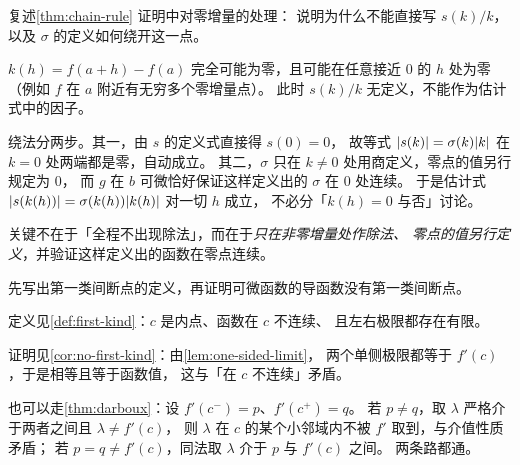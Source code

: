 \begin{exercise}[结构]
  \label{exr:chain-rule-zero}
  复述\cref{thm:chain-rule} 证明中对零增量的处理：
  说明为什么不能直接写 \(s(k)/k\)，以及 \(\sigma\) 的定义如何绕开这一点。
  \begin{solution}
    \(k(h) = f(a+h)-f(a)\) 完全可能为零，且可能在任意接近 \(0\) 的 \(h\) 处为零
    （例如 \(f\) 在 \(a\) 附近有无穷多个零增量点）。
    此时 \(s(k)/k\) 无定义，不能作为估计式中的因子。

    绕法分两步。其一，由 \(s\) 的定义式直接得 \(s(0)=0\)，
    故等式 \(\lvert s(k)\rvert = \sigma(k)\lvert k\rvert\) 在 \(k=0\) 处两端都是零，自动成立。
    其二，\(\sigma\) 只在 \(k \neq 0\) 处用商定义，零点的值另行规定为 \(0\)，
    而 \(g\) 在 \(b\) 可微恰好保证这样定义出的 \(\sigma\) 在 \(0\) 处连续。
    于是估计式 \(\lvert s(k(h))\rvert = \sigma(k(h))\lvert k(h)\rvert\) 对一切 \(h\) 成立，
    不必分「\(k(h)=0\) 与否」讨论。

    关键不在于「全程不出现除法」，而在于\emph{只在非零增量处作除法、
    零点的值另行定义}，并验证这样定义出的函数在零点连续。
  \end{solution}
\end{exercise}

\begin{exercise}[结构]
  \label{exr:no-first-kind}
  先写出第一类间断点的定义，再证明可微函数的导函数没有第一类间断点。
  \begin{solution}
    定义见\cref{def:first-kind}：\(c\) 是内点、函数在 \(c\) 不连续、
    且左右极限都存在有限。

    证明见\cref{cor:no-first-kind}：由\cref{lem:one-sided-limit}，
    两个单侧极限都等于 \(f'(c)\)，于是相等且等于函数值，
    这与「在 \(c\) 不连续」矛盾。

    也可以走\cref{thm:darboux}：设 \(f'(c^{-})=p\)、\(f'(c^{+})=q\)。
    若 \(p \neq q\)，取 \(\lambda\) 严格介于两者之间且 \(\lambda \neq f'(c)\)，
    则 \(\lambda\) 在 \(c\) 的某个小邻域内不被 \(f'\) 取到，与介值性质矛盾；
    若 \(p=q \neq f'(c)\)，同法取 \(\lambda\) 介于 \(p\) 与 \(f'(c)\) 之间。
    两条路都通。
  \end{solution}
\end{exercise}

